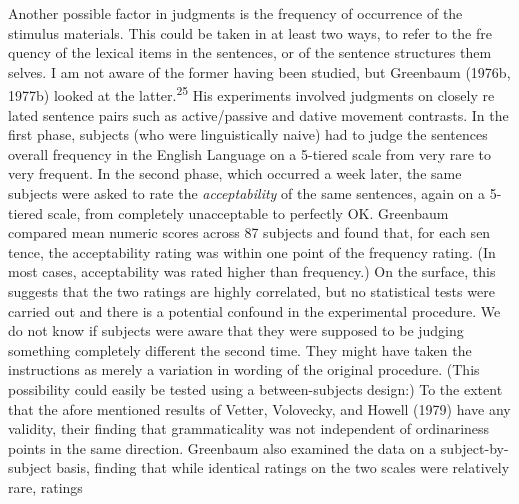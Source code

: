 \begin{styleTextbody}
Another possible factor in judgments is the frequency of occurrence of the stimulus materials. This could be taken in at least two ways, to refer to the fre\- quency of the lexical items in the sentences, or of the sentence structures them\- selves. I am not aware of the former having been studied, but Greenbaum (1976b, 1977b) looked at the latter.\textsuperscript{25}\textsuperscript{ }His experiments involved judgments on closely re\- lated sentence pairs such as active/passive and dative movement contrasts. In the first phase, subjects (who were linguistically naive) had to judge the sentences{\textquotesingle} {\textquotedbl}overall frequency in the English Language{\textquotedbl} on a 5-tiered scale from {\textquotedbl}very rare{\textquotedbl} to {\textquotedbl}very frequent.{\textquotedbl} In the second phase, which occurred a week later, the same subjects were asked to rate the \textit{acceptability}\textit{ }of the same sentences, again on a 5-tiered scale, from {\textquotedbl}completely unacceptable{\textquotedbl} to {\textquotedbl}perfectly OK.{\textquotedbl} Greenbaum compared mean numeric scores across 87 subjects and found that, for each sen\- tence, the acceptability rating was within one point of the frequency rating. (In most cases, acceptability was rated higher than frequency.) On the surface, this suggests that the two ratings are highly correlated, but no statistical tests were carried out and there is a potential confound in the experimental procedure. We do not know if subjects were aware that they were supposed to be judging something completely different the second time. They might have taken the instructions as merely a variation in wording of the original procedure. (This possibility could easily be tested using a between-subjects design:) To the extent that the afore\- mentioned results of Vetter, Volovecky, and Howell (1979) have any validity, their finding that grammaticality was not independent of ordinariness points in the same direction. Greenbaum also examined the data on a subject-by-subject basis, finding that while identical ratings on the two scales were relatively rare, ratings
\end{styleTextbody}


